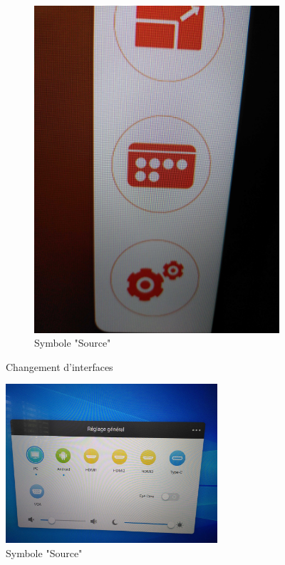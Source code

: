 \documentclass[10pt]{article}
\begin{document}
\begin{figure}[h!]
	\hfill
 	\begin{subfigure}[b]{0.4\textwidth}
		\includegraphics[width=\textwidth]{IMG_20220628_165547.jpg}
		\caption{Symbole "Source"}
		\label{fig:symb-source}
	\end{subfigure}
	\caption{Changement d'interfaces}
\end{figure}


\begin{figure}[h!]
\centering
		\includegraphics[width=0.7\textwidth]{IMG_20220628_165558.jpg}
		\caption{Symbole "Source"}
		\label{fig:sources}
\end{figure}
\end{document}
